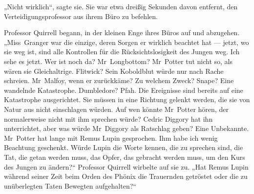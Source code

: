 „Nicht wirklich“, sagte sie. Sie war etwa dreißig Sekunden davon entfernt, den Verteidigungsprofessor aus ihrem Büro zu befehlen.

Professor Quirrell begann, in der kleinen Enge ihres Büros auf und abzugehen.
„Miss~Granger war die einzige, deren Sorgen er wirklich beachtet hat — jetzt, wo sie weg ist, sind alle Kontrollen für die Rücksichtslosigkeit des Jungen weg. Ich sehe es jetzt. Wer ist noch da? Mr~Longbottom? Mr~Potter tut nicht so, als wären sie Gleichaltrige. Flitwick? Sein Koboldblut würde nur nach Rache schreien. Mr~Malfoy, wenn er zurückkäme? Zu welchem Zweck? Snape? Eine wandelnde Katastrophe. Dumbledore? Pfah. Die Ereignisse sind bereits auf eine Katastrophe ausgerichtet. Sie müssen in eine Richtung gelenkt werden, die sie von Natur aus nicht einschlagen würden. Auf wen könnte Mr~Potter hören, der normalerweise nicht mit ihm sprechen würde? Cedric Diggory hat ihn unterrichtet, aber was würde Mr~Diggory als Ratschlag geben? Eine Unbekannte. Mr~Potter hat lange mit Remus Lupin gesprochen. Ihm habe ich wenig Beachtung geschenkt. Würde Lupin die Worte kennen, die zu sprechen sind, die Tat, die getan werden muss, das Opfer, das gebracht werden muss, um den Kurs des Jungen zu ändern?“
Professor Quirrell wirbelte auf sie zu.
„Hat Remus Lupin während seiner Zeit beim Orden des Phönix die Trauernden getröstet oder die zu unüberlegten Taten Bewegten aufgehalten?“

